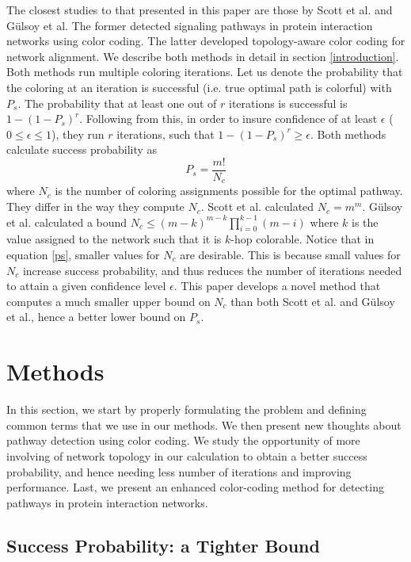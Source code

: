 \documentclass{ws-procs11x85}
\begin{document}
The closest studies to that presented in this paper are those by Scott et
al.\cite{scott} and G{\"u}lsoy et al\cite{gulsoy}. The former detected signaling
pathways in protein interaction networks using color coding. The latter
developed topology-aware color coding for network alignment. We describe both
methods in detail in section \ref{introduction}. Both methods run multiple 
coloring iterations. Let us denote the probability that the coloring at an
iteration is successful (i.e. true optimal path is colorful) with $P_s$. The
probability that at least one out of $r$ iterations is successful is $1 - (1 -
P_s)^r$. Following from this, in order to insure confidence of at least
$\epsilon$ ($0 \leq \epsilon \leq 1$), they run $r$ iterations, such that $1 -
(1 - P_s)^r \geq \epsilon$. Both methods calculate success probability as
\begin{equation}
P_s = \frac{m!}{N_c}
\label{ps}
\end{equation}
where $N_c$ is the number of coloring assignments possible for the optimal
pathway. They differ in the way they compute $N_c$. Scott et al.\cite{scott}
calculated $N_c = m^m$. G{\"u}lsoy et al.\cite{gulsoy} calculated a bound $N_c
\leq (m - k)^{m - k} \prod_{i=0}^{k-1} (m - i)$ where $k$ is the value assigned
to the network such that it is $k$-hop colorable. Notice that in equation
\ref{ps}, smaller values for $N_c$ are desirable. This is because small values
for $N_c$ increase success probability, and thus reduces the number of
iterations needed to attain a given confidence level $\epsilon$. This paper
develops a novel method that computes a much smaller upper bound on $N_c$ than
both Scott et al. and G{\"u}lsoy et al., hence a better lower bound on $P_s$.

\section{Methods}
In this section, we start by properly formulating the problem and defining
common terms that we use in our methods. We then present new thoughts about
pathway detection using color coding. We study the opportunity of more involving
of network topology in our calculation to obtain a better success probability,
and hence needing less number of iterations and improving performance. Last, we
present an enhanced color-coding method for detecting pathways in protein
interaction networks.

\subsection{Success Probability: a Tighter Bound}
\end{document}
